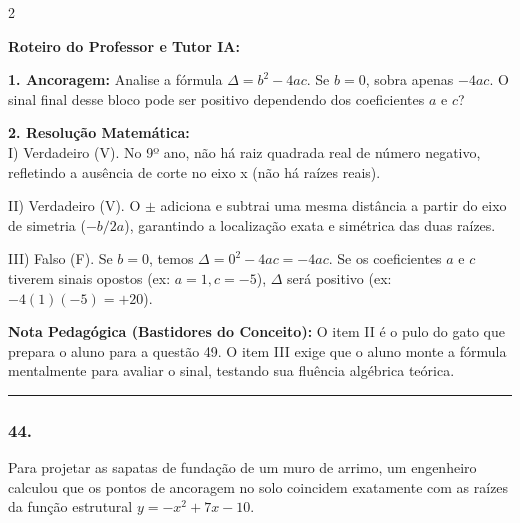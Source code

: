 \begin{multicols*}{2}
\ifgabarito
    \begin{tcolorbox}[colback=CorTitUm!5, colframe=CorTitUm, boxrule=1pt, arc=4pt, left=6pt, right=6pt, top=6pt, bottom=6pt]
    \small\textbf{\textcolor{CorTitUm}{Roteiro do Professor e Tutor IA:}}\par\vspace{0.1cm}
    \color{CinzaEscuro}
    \textbf{1. Ancoragem:} Analise a fórmula $\Delta = b^2 - 4ac$. Se $b=0$, sobra apenas $-4ac$. O sinal final desse bloco pode ser positivo dependendo dos coeficientes $a$ e $c$?\par\vspace{0.1cm}
    \textbf{2. Resolução Matemática:}\\
    I) Verdadeiro (V). No 9º ano, não há raiz quadrada real de número negativo, refletindo a ausência de corte no eixo x (não há raízes reais).
    
    II) Verdadeiro (V). O $\pm$ adiciona e subtrai uma mesma distância a partir do eixo de simetria ($-b/2a$), garantindo a localização exata e simétrica das duas raízes.
    
    III) Falso (F). Se $b=0$, temos $\Delta = 0^2 - 4ac = -4ac$. Se os coeficientes $a$ e $c$ tiverem sinais opostos (ex: $a=1, c=-5$), $\Delta$ será positivo (ex: $-4(1)(-5) = +20$).
    \end{tcolorbox}
    \vspace{0.15cm}
    
    \begin{boxexplicacao}
    \textbf{Nota Pedagógica (Bastidores do Conceito):} O item II é o pulo do gato que prepara o aluno para a questão 49. O item III exige que o aluno monte a fórmula mentalmente para avaliar o sinal, testando sua fluência algébrica teórica.
    \end{boxexplicacao}
\fi

\par\vspace{\espacoQuestao}

\noindent\textcolor{CorLinha}{\rule{\linewidth}{0.5pt}} 
\par\vspace{\espacoPreQuestao}
\subsubsection*{44.} 
\begin{enunciadoLiteral}
Para projetar as sapatas de fundação de um muro de arrimo, um engenheiro calculou que os pontos de ancoragem no solo coincidem exatamente com as raízes da função estrutural $y = -x^2 + 7x - 10$.


\end{enunciadoLiteral}
\end{multicols*}
